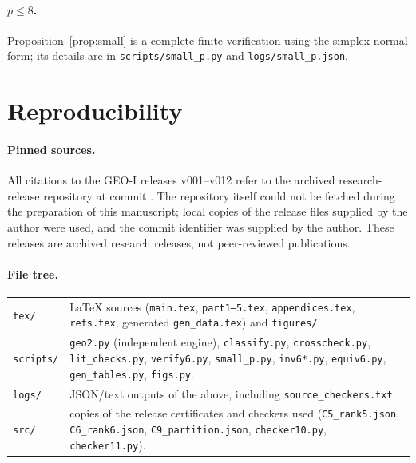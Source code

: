 \paragraph{$p\le8$.} Proposition~\ref{prop:small} is a complete finite verification using the simplex normal form; its details are in \texttt{scripts/small\_p.py} and \texttt{logs/small\_p.json}.

\section{Reproducibility}\label{app:repro}

\paragraph{Pinned sources.} All citations to the GEO-I releases v001--v012 refer to the archived research-release repository at commit \geoicommit. The repository itself could not be fetched during the preparation of this manuscript; local copies of the release files supplied by the author were used, and the commit identifier was supplied by the author. These releases are archived research releases, not peer-reviewed publications.

\paragraph{File tree.}
\begin{center}\small
\begin{tabular}{@{}lp{10.5cm}@{}}
\texttt{tex/} & LaTeX sources (\texttt{main.tex}, \texttt{part1--5.tex}, \texttt{appendices.tex}, \texttt{refs.tex}, generated \texttt{gen\_data.tex}) and \texttt{figures/}.\\
\texttt{scripts/} & \texttt{geo2.py} (independent engine), \texttt{classify.py}, \texttt{crosscheck.py}, \texttt{lit\_checks.py}, \texttt{verify6.py}, \texttt{small\_p.py}, \texttt{inv6*.py}, \texttt{equiv6.py}, \texttt{gen\_tables.py}, \texttt{figs.py}.\\
\texttt{logs/} & JSON/text outputs of the above, including \texttt{source\_checkers.txt}.\\
\texttt{src/} & copies of the release certificates and checkers used (\texttt{C5\_rank5.json}, \texttt{C6\_rank6.json}, \texttt{C9\_partition.json}, \texttt{checker10.py}, \texttt{checker11.py}).\\
\end{tabular}
\end{center}

